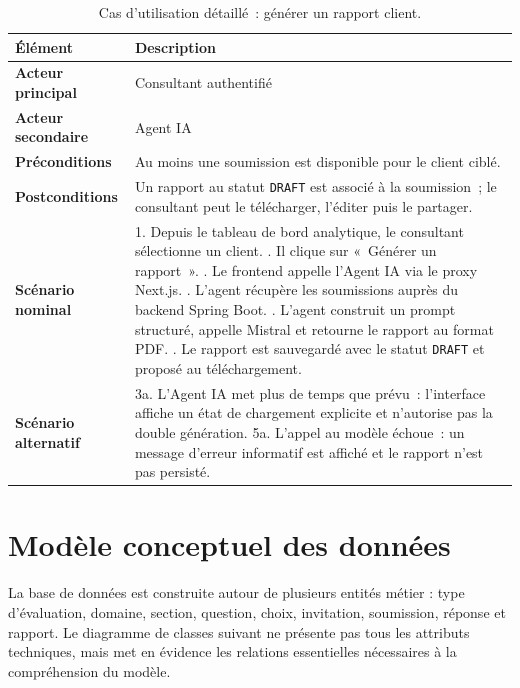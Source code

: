 \documentclass[12pt,a4paper]{report}
\begin{document}
\begin{table}[H]
\centering
\caption{Cas d'utilisation détaillé~: générer un rapport client.}
\begin{tabularx}{\textwidth}{>{\bfseries}L{3.5cm}Y}
\toprule
Élément & Description \\
\midrule
Acteur principal & Consultant authentifié \\
Acteur secondaire & Agent IA \\
Préconditions & Au moins une soumission est disponible pour le client ciblé. \\
Postconditions & Un rapport au statut \texttt{DRAFT} est associé à la soumission~; le consultant peut le télécharger, l'éditer puis le partager. \\
Scénario nominal &
1. Depuis le tableau de bord analytique, le consultant sélectionne un client. . Il clique sur «~Générer un rapport~». . Le frontend appelle l'Agent IA via le proxy Next.js. . L'agent récupère les soumissions auprès du backend Spring Boot. . L'agent construit un prompt structuré, appelle Mistral et retourne le rapport au format PDF. . Le rapport est sauvegardé avec le statut \texttt{DRAFT} et proposé au téléchargement. \\
Scénario alternatif &
3a. L'Agent IA met plus de temps que prévu~: l'interface affiche un état de chargement explicite et n'autorise pas la double génération. \newline
5a. L'appel au modèle échoue~: un message d'erreur informatif est affiché et le rapport n'est pas persisté. \\
\bottomrule
\end{tabularx}
\label{tab:uc-report}
\end{table}

\section{Modèle conceptuel des données}
La base de données est construite autour de plusieurs entités métier : type d'évaluation, domaine, section, question, choix, invitation, soumission, réponse et rapport. Le diagramme de classes suivant ne présente pas tous les attributs techniques, mais met en évidence les relations essentielles nécessaires à la compréhension du modèle.
\end{document}
